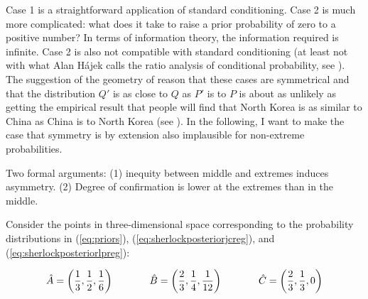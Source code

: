 \documentclass[11pt]{article}
\begin{document}
Case 1 is a straightforward application of standard conditioning. Case
2 is much more complicated: what does it take to raise a prior
probability of zero to a positive number? In terms of information
theory, the information required is infinite. Case 2 is also not
compatible with standard conditioning (at least not with what Alan
H{\'a}jek calls the ratio analysis of conditional probability, see
). The suggestion of the geometry of reason that
these cases are symmetrical and that the distribution $Q'$ is as close
to $Q$ as $P'$ is to $P$ is about as unlikely as getting the empirical
result that people will find that North Korea is as similar to China
as China is to North Korea (see ). In the
following, I want to make the case that symmetry is by extension also
implausible for non-extreme probabilities.

Two formal arguments: (1) inequity between middle and extremes induces
asymmetry. (2) Degree of confirmation is lower at the extremes than in
the middle.

Consider the points in three-dimensional space corresponding to the
probability distributions in (\ref{eq:priors}),
(\ref{eq:sherlockposteriorjcreg}), and
(\ref{eq:sherlockposteriorlpreg}):

\begin{equation}
  \label{eq:asy1}
    \hat{A}=\left(\frac{1}{3},\frac{1}{2},\frac{1}{6}\right) \hspace{.5in}
    \hat{B}=\left(\frac{2}{3},\frac{1}{4},\frac{1}{12}\right)  \hspace{.5in}
    \hat{C}=\left(\frac{2}{3},\frac{1}{3},0\right)
\end{equation}
\end{document}
